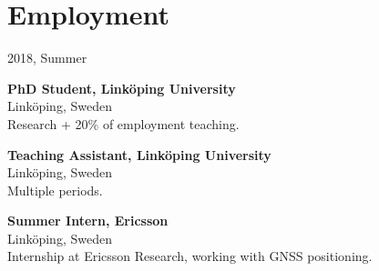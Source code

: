 \section*{Employment}
\newcommand{\employed}[5]{%
\item [#2] \textbf{#1, #3}\\%
    {\footnotesize#4}\\%
    #5
}
\begin{labeling}{2018, Summer}
    \employed{PhD Student}{2020 --}{Linköping University}{Linköping, Sweden}{Research + 20\% of employment teaching.}
    \employed{Teaching Assistant}{2016--2019}{Linköping University}{Linköping, Sweden}{Multiple periods.}
    \employed{Summer Intern}{2018, Summer}{Ericsson}{Linköping, Sweden}{Internship at Ericsson Research, working with GNSS positioning.}
\end{labeling}
